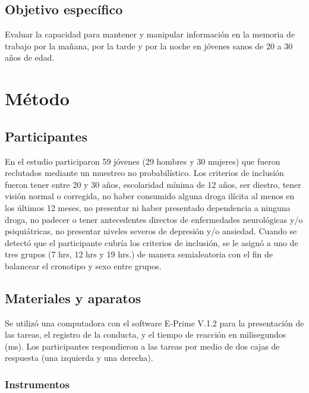 \documentclass[12pt,letterpaper,final]{article}
\let\cite\cite %
\begin{document}
\subsection{Objetivo específico}
Evaluar la capacidad para mantener y manipular información en la memoria de trabajo  por la mañana, por la tarde y por la noche en jóvenes sanos de 20 a 30 años de edad. %

\newpage

\section{Método}
\subsection{Participantes}
En el estudio participaron 59 jóvenes (29 hombres y 30 mujeres) que fueron reclutados mediante un muestreo no probabilístico. Los criterios de inclusión fueron tener entre 20 y 30 años, escolaridad mínima de 12 años, ser diestro, tener visión normal o corregida, no haber consumido alguna droga ilícita al menos en los últimos 12 meses, no presentar ni haber presentado dependencia a ninguna droga, no padecer o tener antecedentes directos de enfermedades neurológicas y/o psiquiátricas, no presentar niveles severos de depresión y/o ansiedad. Cuando se detectó que el participante cubría los criterios de inclusión, se le asignó a uno de tres grupos (7 hrs, 12 hrs y 19 hrs.) de manera semialeatoria con el fin de balancear el cronotipo y sexo entre grupos.

\subsection{Materiales y aparatos}
Se utilizó una computadora con el software E-Prime V.1.2 \textit{\cite{PsychologySoftwareTools2012}} para la presentación de las tareas,  el registro de la conducta, y el tiempo de reacción en milisegundos (ms). Los participantes respondieron a las tareas por medio de dos cajas de respuesta (una izquierda y una derecha).

\subsubsection{Instrumentos}
\end{document}
